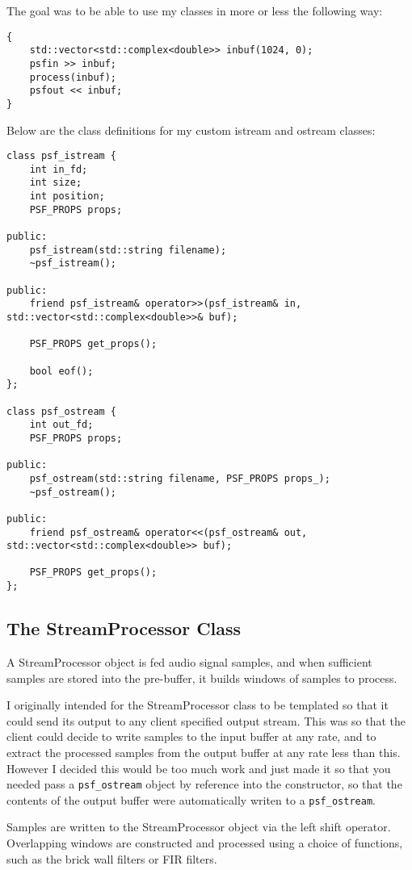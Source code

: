 The goal was to be able to use my classes in more or less the following way:
\begin{verbatim}
{
    std::vector<std::complex<double>> inbuf(1024, 0);
    psfin >> inbuf;
    process(inbuf);
    psfout << inbuf;
}
\end{verbatim}

Below are the class definitions for my custom istream and ostream classes:
\begin{verbatim}
class psf_istream {
    int in_fd;
    int size;
    int position;
    PSF_PROPS props;

public:
    psf_istream(std::string filename);
    ~psf_istream();

public:
    friend psf_istream& operator>>(psf_istream& in, std::vector<std::complex<double>>& buf);

    PSF_PROPS get_props();

    bool eof();
};

class psf_ostream {
    int out_fd;
    PSF_PROPS props;

public:
    psf_ostream(std::string filename, PSF_PROPS props_);
    ~psf_ostream();

public:
    friend psf_ostream& operator<<(psf_ostream& out, std::vector<std::complex<double>> buf);

    PSF_PROPS get_props();
};
\end{verbatim}

\pagebreak 

\subsection{The StreamProcessor Class}
A StreamProcessor object is fed audio signal samples, and when sufficient samples
are stored into the pre-buffer, it builds windows of samples to process.

I originally intended for the StreamProcessor class to be templated so that 
it could send its output to any client specified output stream.
This was so that the client could decide to write samples to the input buffer
at any rate, and to extract the processed samples from the output buffer
at any rate less than this.
However I decided this would be too much work and just made it so that you 
needed pass a \verb|psf_ostream| object by reference into the constructor, so that
the contents of the output buffer were automatically writen to a \verb|psf_ostream|.

Samples are written to the StreamProcessor object via the left shift operator.
Overlapping windows are constructed and processed using a choice of functions,
such as the brick wall filters or FIR filters.

